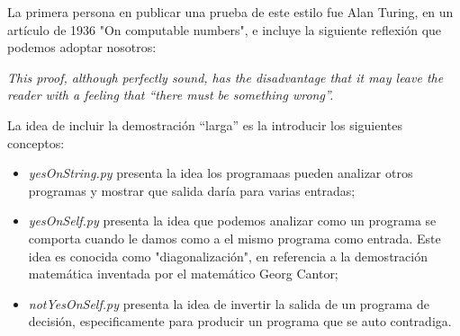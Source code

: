 \documentclass[xcolor=table]{beamer}
\begin{document}
\begin{frame}  \scriptsize  

La primera persona en publicar una prueba de este estilo fue Alan Turing, en un artículo de 1936 "On computable numbers", e incluye la siguiente reflexión que podemos adoptar nosotros:

\begin{center}
    \textit{This proof, although perfectly sound, has the disadvantage that it may leave the reader with a feeling that “there must be something wrong”.}
\end{center}

La idea de incluir la demostración ``larga'' es la introducir los siguientes conceptos:

\begin{itemize}
    \item \textit{yesOnString.py} presenta la idea los programaas pueden analizar otros programas y mostrar que salida daría para varias entradas;
    \item \textit{yesOnSelf.py} presenta la idea que podemos analizar como un programa se comporta cuando le damos como a el mismo programa como entrada. Este idea es conocida como "diagonalización", en referencia a la demostración matemática inventada por el matemático Georg Cantor;
    \item \textit{notYesOnSelf.py} presenta la idea de invertir la salida de un programa de decisión, especificamente para producir un programa que se auto contradiga.
\end{itemize}


\end{frame} 
\end{document}
